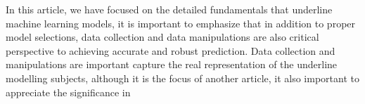 
\par
In this article, we have focused on the detailed fundamentals that underline machine learning models, it is important to emphasize that in addition to proper model selections, data collection and data manipulations are also critical perspective to achieving accurate and robust prediction. Data collection and manipulations are important capture the real representation of the underline modelling subjects, although it is the focus of another article, it also important to appreciate the significance in 
\par 

